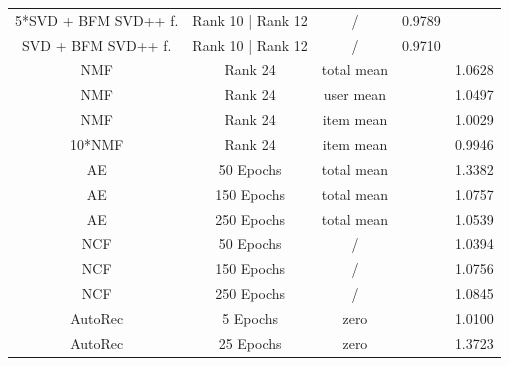 \documentclass[10pt,conference,compsocconf]{IEEEtran}
\begin{document}
\begin{table}[h]
\begin{tabular}{|| c | c | c | c | c ||}
            5*SVD + BFM SVD++ f. & Rank 10 | Rank 12                     & /                       & 0.9789                 &                         \\
            SVD + BFM SVD++ f.   & Rank 10 | Rank 12                     & /                       & 0.9710                 &                         \\
            \hline
            NMF                  & Rank 24                               & total mean              &                        & 1.0628                  \\
            NMF                  & Rank 24                               & user mean               &                        & 1.0497                  \\
            NMF                  & Rank 24                               & item mean               &                        & 1.0029                  \\
            10*NMF               & Rank 24                               & item mean               &                        & 0.9946                  \\
            \hline
            AE                   & 50 Epochs                             & total mean              &                        & 1.3382                  \\
            AE                   & 150 Epochs                            & total mean              &                        & 1.0757                  \\
            AE                   & 250 Epochs                            & total mean              &                        & 1.0539                  \\
            \hline
            NCF                  & 50 Epochs                             & /                       &                        & 1.0394                  \\
            NCF                  & 150 Epochs                            & /                       &                        & 1.0756                  \\
            NCF                  & 250 Epochs                            & /                       &                        & 1.0845                  \\
            \hline
            AutoRec              & 5 Epochs                              & zero                    &                        & 1.0100                  \\
            AutoRec              & 25 Epochs                             & zero                    &                        & 1.3723                  \\

\end{tabular}
\end{table}
\end{document}
